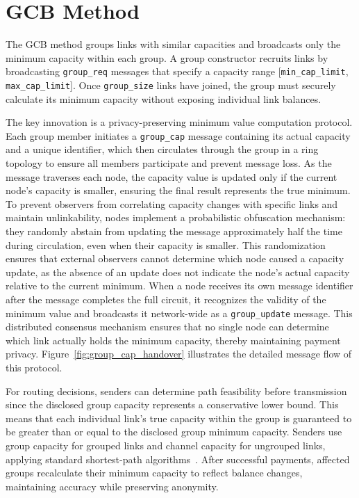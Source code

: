 \documentclass[conference]{IEEEtran}
\newcommand{\groupcap}{\texttt{group\_cap}}
\newcommand{\groupupdate}{\texttt{group\_update}}
\newcommand{\groupreq}{\texttt{group\_req}}
\newcommand{\groupsize}{\texttt{group\_size}}
\newcommand{\mincaplimit}{\texttt{min\_cap\_limit}}
\newcommand{\maxcaplimit}{\texttt{max\_cap\_limit}}
\begin{document}
\section{GCB Method}

The GCB method groups links with similar capacities and broadcasts only the minimum capacity within each group.
A group constructor recruits links by broadcasting \groupreq{} messages that specify a capacity range [\mincaplimit{}, \maxcaplimit{}].
Once \groupsize{} links have joined, the group must securely calculate its minimum capacity without exposing individual link balances.

The key innovation is a privacy-preserving minimum value computation protocol.
Each group member initiates a \groupcap{} message containing its actual capacity and a unique identifier, which then circulates through the group in a ring topology to ensure all members participate and prevent message loss.
As the message traverses each node, the capacity value is updated only if the current node's capacity is smaller, ensuring the final result represents the true minimum.
To prevent observers from correlating capacity changes with specific links and maintain unlinkability, nodes implement a probabilistic obfuscation mechanism: they randomly abstain from updating the message approximately half the time during circulation, even when their capacity is smaller. This randomization ensures that external observers cannot determine which node caused a capacity update, as the absence of an update does not indicate the node's actual capacity relative to the current minimum.
When a node receives its own message identifier after the message completes the full circuit, it recognizes the validity of the minimum value and broadcasts it network-wide as a \groupupdate{} message.
This distributed consensus mechanism ensures that no single node can determine which link actually holds the minimum capacity, thereby maintaining payment privacy.
Figure~\ref{fig:group_cap_handover} illustrates the detailed message flow of this protocol.

For routing decisions, senders can determine path feasibility before transmission since the disclosed group capacity represents a conservative lower bound.
This means that each individual link's true capacity within the group is guaranteed to be greater than or equal to the disclosed group minimum capacity.
Senders use group capacity for grouped links and channel capacity for ungrouped links, applying standard shortest-path algorithms~\cite{lnd,eclair,clightning}.
After successful payments, affected groups recalculate their minimum capacity to reflect balance changes, maintaining accuracy while preserving anonymity.
\end{document}
